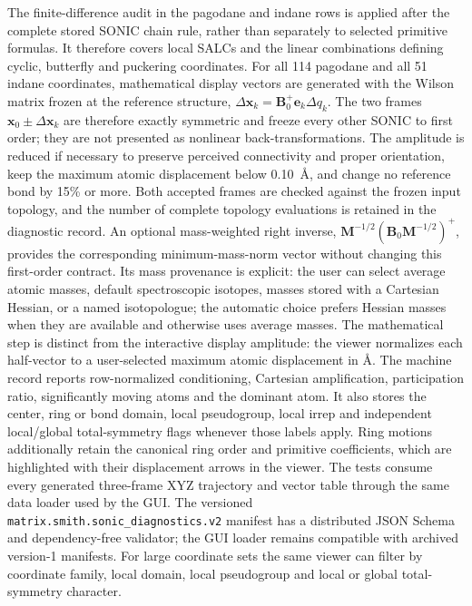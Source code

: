 \documentclass[journal=jctcce,manuscript=article,layout=traditional]{achemso}
\theoremstyle{definition}
\begin{document}
The finite-difference audit in the pagodane and indane rows is applied after
the complete stored SONIC chain rule, rather than separately to selected
primitive formulas.  It therefore covers local SALCs and the linear
combinations defining cyclic, butterfly and puckering coordinates.  For all 114
pagodane and all 51 indane coordinates, mathematical display vectors are
generated with the Wilson
matrix frozen at the reference structure,
\(\Delta\mathbf{x}_k=\mathbf{B}_0^+\mathbf{e}_k\Delta q_k\).  The two frames
\(\mathbf{x}_0\pm\Delta\mathbf{x}_k\) are therefore exactly symmetric and
freeze every other SONIC to first order; they are not presented as nonlinear
back-transformations.  The amplitude is reduced if necessary to preserve
perceived connectivity and proper orientation, keep the maximum atomic
displacement below 0.10~\AA, and change no reference bond by 15\% or more.
Both accepted frames are checked against the frozen input topology, and the
number of complete topology evaluations is retained in the diagnostic record.
An optional mass-weighted right inverse,
\(\mathbf{M}^{-1/2}(\mathbf{B}_0\mathbf{M}^{-1/2})^+\), provides the
corresponding minimum-mass-norm vector without changing this first-order
contract.  Its mass provenance is explicit: the user can select average atomic
masses, default spectroscopic isotopes, masses stored with a Cartesian Hessian,
or a named isotopologue; the automatic choice prefers Hessian masses when they
are available and otherwise uses average masses.  The mathematical step is
distinct from the interactive display
amplitude: the viewer normalizes each half-vector to a user-selected maximum
atomic displacement in \AA.  The machine record reports row-normalized
conditioning, Cartesian amplification, participation ratio, significantly
moving atoms and the dominant atom.  It also stores the center, ring or bond
domain, local pseudogroup, local irrep and independent local/global
total-symmetry flags whenever those labels apply.  Ring motions additionally
retain the
canonical ring order and primitive coefficients, which are highlighted with
their displacement arrows in the viewer.  The tests consume every generated
three-frame XYZ trajectory and vector table through the same data loader used
by the GUI.  The versioned \texttt{matrix.smith.sonic\_diagnostics.v2}
manifest has a distributed JSON Schema and dependency-free validator; the GUI
loader remains compatible with archived version-1 manifests.  For large
coordinate sets the same viewer can filter by coordinate family, local domain,
local pseudogroup and local or global total-symmetry character.
\end{document}
